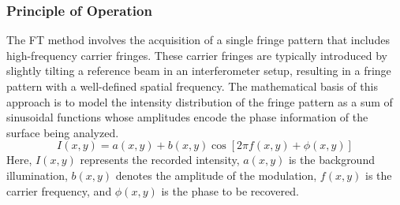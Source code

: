 \documentclass[../main.tex]{subfiles}
\begin{document}
\subsubsection{Principle of Operation}
\vspace{-8pt}
The FT method involves the acquisition of a single fringe pattern that includes high-frequency carrier fringes. These carrier fringes are typically introduced by slightly tilting a reference beam in an interferometer setup, resulting in a fringe pattern with a well-defined spatial frequency. The mathematical basis of this approach is to model the intensity distribution of the fringe pattern as a sum of sinusoidal functions whose amplitudes encode the phase information of the surface being analyzed.
\begin{equation}
    I(x, y) = a(x, y) + b(x, y) \cos[2\pi f(x, y) + \phi(x, y)]
\end{equation}
Here, \( I(x, y) \) represents the recorded intensity, \( a(x, y) \) is the background illumination, \( b(x, y) \) denotes the amplitude of the modulation, \( f(x, y) \) is the carrier frequency, and \( \phi(x, y) \) is the phase to be recovered.
\end{document}

